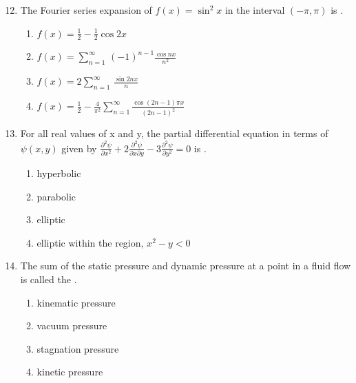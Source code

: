 \documentclass[journal]{IEEEtran}
\theoremstyle{remark}
\begin{document}
\begin{enumerate}[itemsep=1em]
\setcounter{enumi}{11}
\item The Fourier series expansion of $f(x)=\sin^2{x}$ in the interval $(-\pi,\pi)$ is \underline{\hspace{1cm}}. 

\begin{enumerate}[leftmargin=2.5em, labelsep=0.5em, itemsep=0.5em]
    \item $f(x)=\frac{1}{2}-\frac{1}{2}\cos{2x}$
    \item $f(x)=\sum_{n=1}^{\infty}\,(-1)^{n-1}\frac{\cos{nx}}{n^2}$
    \item $f(x)=2\sum_{n=1}^{\infty}\,\frac{\sin{2nx}}{n}$
    \item $f(x)=\frac{1}{2}-\frac{4}{\pi^2}\sum_{n=1}^{\infty}\frac{\cos{(2n-1)\pi x}}{(2n-1)^2}$
\end{enumerate}
\end{enumerate}

\newpage
\vspace*{0.25cm}

\begin{enumerate}[itemsep=1em]
\setcounter{enumi}{12}
\item For all real values of x and y, the partial differential equation in terms of $\psi(x,y)$ given by $\frac{\partial^2\psi}{\partial x^2}+2\frac{\partial^2\psi}{\partial x \partial y }-3\frac{\partial^2\psi}{\partial y^2}=0$ is \underline{\hspace{1cm}}.
\begin{enumerate}[leftmargin=2.5em, labelsep=0.5em, itemsep=0.5em]
    \item hyperbolic 
    \item parabolic  
    \item elliptic 
    \item elliptic within the region, $x^2-y<0$
\end{enumerate}
\end{enumerate}

\begin{enumerate}[itemsep=1em]
\setcounter{enumi}{13}
\item The sum of the static pressure and dynamic pressure at a point in a fluid flow is called the \underline{\hspace{1cm}}. 
\begin{enumerate}[leftmargin=2.5em, labelsep=0.5em, itemsep=0.5em]
    \item kinematic pressure
    \item vacuum pressure
    \item stagnation pressure
    \item kinetic pressure
    
\end{enumerate}    
\end{enumerate}
\end{document}
